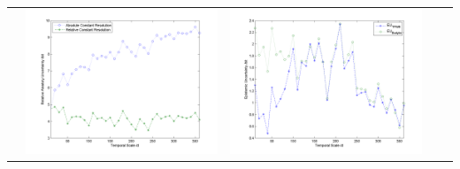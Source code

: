 \documentclass[11pt]{article}
\begin{document}
\begin{table}[H]
{\begin{tabular}{c  c   c   c c }
&\begin{minipage}{.4\textwidth}\includegraphics[width=\linewidth]{resultgraph/11532500AU.png}\end{minipage}
&\begin{minipage}{.4\textwidth}\includegraphics[width=\linewidth]{resultgraph/11532500EU.png}\end{minipage}
\\

\end{tabular}}
\end{table}
\end{document}
